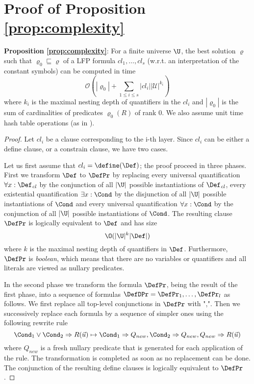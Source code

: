 \section{Proof of Proposition
  \ref{prop:complexity}}\label{proof:prop:complexity}
{\bf Proposition \ref{prop:complexity}}:
For a finite universe $\U$, the best solution $\varrho$ such that
  $\varrho_0 \sqsubseteq \varrho$ of a LFP formula $cl_1, \ldots,
  cl_s$ (w.r.t. an interpretation of the constant symbols) can be
  computed in time
\[
\mathcal{O}(|\varrho_0| + \sum_{1\leq i \leq s} |cl_i||\mathcal{U}|^{k_i})
\]
where $k_i$ is the maximal nesting depth of quantifiers in the $cl_i$
and $|\varrho_0|$ is the sum of cardinalities of predicates
$\varrho_0(R)$ of rank $0$. We also assume unit time hash table
operations (as in \cite{bib:complex}).
\begin{proof}
  Let $cl_i$ be a clause corresponding to the i-th layer. Since $cl_i$
  can be either a define clause, or a constrain clause, we have two
  cases.

  Let us first assume that $cl_i=\define(\Def)$; the proof proceed in
  three phases. First we transform $\Def$ to $\DefPr$ by replacing
  every universal quantification $\forall x: \Def_{\it cl}$ by the conjunction
  of all $|\U|$ possible instantiations of $\Def_{\it cl}$, every existential
  quantification $\exists x: \Cond$ by the disjunction of all $|\U|$
  possible instantiations of $\Cond$ and every universal quantification
  $\forall x: \Cond$ by the conjunction of all $|\U|$ possible
  instantiations of $\Cond$. The resulting clause $\DefPr$
  is logically equivalent to $\Def$ and has size
  \begin{equation}
    \O(|\U|^{k}|\Def|) \label{eq:def-size}
  \end{equation}
  where $k$ is the maximal nesting depth of quantifiers in $\Def$.
  Furthermore, $\DefPr$ is {\it boolean}, which means that there are
  no variables or quantifiers and all literals are viewed as nullary
  predicates.



  In the second phase we transform the formula $\DefPr$, being the
  result of the first phase, into a sequence of formulas
  $\DefDPr=\DefPr_1, \ldots, \DefPr_l$ as follows. We first replace
  all top-level conjunctions in $\DefPr$ with ",". Then we
  successively replace each formula by a sequence of simpler ones
  using the following rewrite rule
\[\Cond_1 \vee \Cond_2
  \Rightarrow R(\vec u) \mapsto \Cond_1 \Rightarrow Q_{new},
  \Cond_2 \Rightarrow Q_{new}, Q_{new} \Rightarrow R(\vec u)
\] 
where
  $Q_{new}$ is a fresh nullary predicate that is generated for each
  application of the rule. The transformation is completed as soon as no
  replacement can be done. The conjunction of the resulting define
  clauses is logically equivalent to $\DefPr$.


\end{proof}
